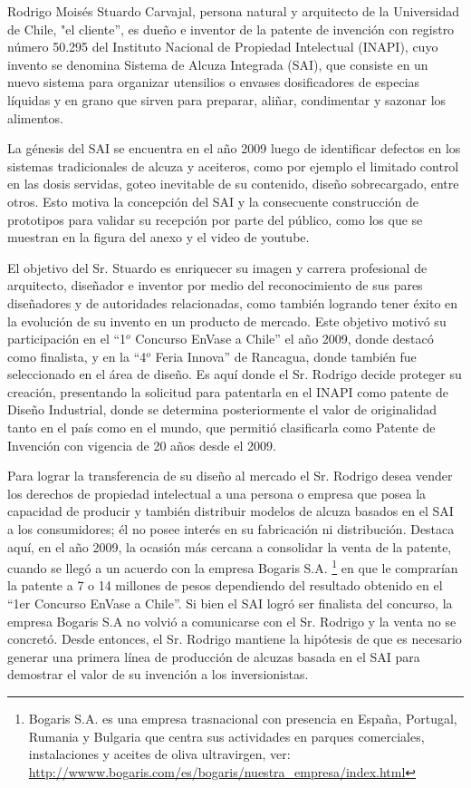 Rodrigo Moisés Stuardo Carvajal, persona natural y arquitecto de la Universidad de Chile, "el cliente'', es dueño e inventor de la patente de invención con registro número 50.295 del Instituto Nacional de Propiedad Intelectual (INAPI), cuyo invento se denomina Sistema de Alcuza Integrada (SAI), que consiste en un nuevo sistema para organizar utensilios o envases dosificadores de especias líquidas y en grano que sirven para preparar, aliñar, condimentar y sazonar los alimentos.

La génesis del SAI se encuentra en el año 2009 luego de identificar defectos en los sistemas tradicionales de alcuza y aceiteros, como por ejemplo el limitado control en las dosis servidas, goteo inevitable de su contenido, diseño sobrecargado, entre otros. Esto motiva la concepción del SAI y la consecuente construcción de prototipos para validar su recepción por parte del público, como los que se muestran en la figura del anexo y el video de youtube.

El objetivo del Sr. Stuardo es enriquecer su imagen y carrera profesional de arquitecto, diseñador e inventor por medio del reconocimiento de sus pares diseñadores y de autoridades relacionadas, como también logrando tener éxito en la evolución de su invento en un producto de mercado. Este objetivo motivó su participación en el  “1$^{o}$  Concurso EnVase a Chile” el año 2009, donde destacó como finalista, y en la “4$^{o}$ Feria Innova” de Rancagua, donde también fue seleccionado en el área de diseño. Es aquí donde el Sr. Rodrigo decide proteger su creación, presentando la solicitud para patentarla en el INAPI como patente de Diseño Industrial, donde se determina posteriormente el valor de originalidad tanto en el país como en el mundo, que permitió clasificarla como Patente de Invención con vigencia de 20 años desde el 2009.

Para lograr la transferencia de su diseño al mercado el Sr. Rodrigo desea vender los derechos de propiedad intelectual a una persona o empresa que posea la capacidad de producir y también distribuir modelos de alcuza basados en el SAI a los consumidores; él no posee interés en su fabricación ni distribución. Destaca aquí, en el año 2009, la ocasión más cercana a consolidar la venta de la patente, cuando se llegó a un acuerdo con la empresa Bogaris S.A.
\footnote{
Bogaris S.A. es una empresa trasnacional con presencia en España, Portugal, Rumania y Bulgaria que centra sus actividades en parques comerciales, instalaciones y aceites de oliva ultravirgen, ver:
 \url{http://wwww.bogaris.com/es/bogaris/nuestra_empresa/index.html}

 }
 en que le comprarían la patente a 7 o 14 millones de pesos dependiendo del resultado obtenido en el “1er Concurso EnVase a Chile”. Si bien el SAI logró ser finalista del concurso, la empresa Bogaris S.A no volvió a comunicarse con el Sr. Rodrigo y la venta no se concretó. Desde entonces, el Sr. Rodrigo mantiene la hipótesis de que es necesario generar una primera línea de producción de alcuzas basada en el SAI para demostrar el valor de su invención a los inversionistas.

